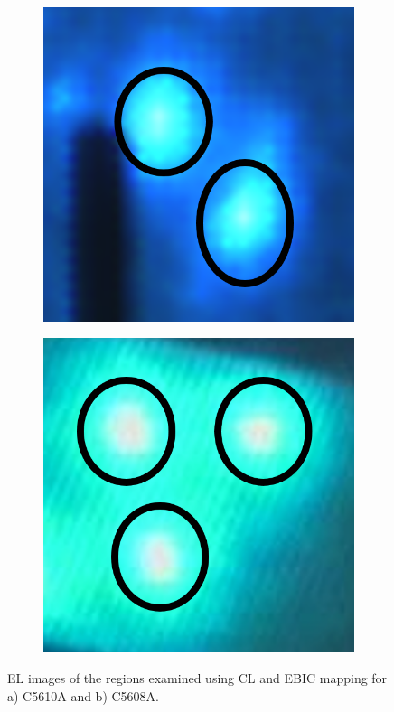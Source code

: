 \begin{figure}[h]
	\hspace*{0.5cm}
	\begin{subfigure}[b]{0.4\textwidth}
		\centering
		\includegraphics[width=0.7\linewidth]{Figs/Ch3/5610CLEBICloc}
		\caption{}
		
	\end{subfigure}%
	\hspace*{2cm}
	\begin{subfigure}[b]{0.4\textwidth}
		\centering
		\includegraphics[width=0.7\linewidth]{Figs/Ch3/5608CLEBICloc}
		\caption{}
	\end{subfigure}%
	
	\caption{EL images of the regions examined using CL and EBIC mapping for a) C5610A and b) C5608A.}
	\label{5610loc}
\end{figure}

